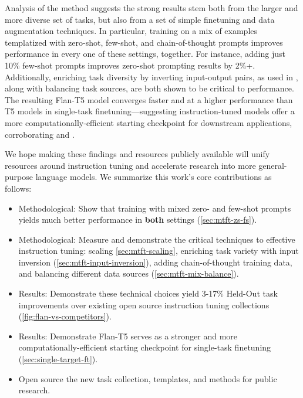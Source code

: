 Analysis of the \flantwo{} method suggests the strong results stem both from the larger and more diverse set of tasks, but also from a set of simple finetuning and data augmentation techniques.
In particular, training on a mix of examples templatized with zero-shot, few-shot, and chain-of-thought prompts improves performance in every one of these settings, together.
For instance, adding just 10\% few-shot prompts improves zero-shot prompting results by 2\%+.
Additionally, enriching task diversity by inverting input-output pairs, as used in \citep{sanh2021multitask,min-etal-2022-metaicl}, along with balancing task sources, are both shown to be critical to performance.
The resulting Flan-T5 model converges faster and at a higher performance than T5 models in single-task finetuning---suggesting instruction-tuned models offer a more computationally-efficient starting checkpoint for downstream applications, corroborating \citet{aribandi2021ext5} and \citet{tfew2022}.

We hope making these findings and resources publicly available will unify resources around instruction tuning and accelerate research into more general-purpose language models.
We summarize this work's core contributions as follows:
\begin{itemize}\itemsep0em
    \vspace{-2 mm}
    \item Methodological: Show that training with mixed zero- and few-shot prompts yields much better performance in \textbf{both} settings (\cref{sec:mtft-zs-fs}).
    \item Methodological: Measure and demonstrate the critical techniques to effective instruction tuning: scaling \cref{sec:mtft-scaling}, enriching task variety with input inversion (\cref{sec:mtft-input-inversion}), adding chain-of-thought training data, and balancing different data sources (\cref{sec:mtft-mix-balance}).
    \item Results: Demonstrate these technical choices yield 3-17\% Held-Out task improvements over existing open source instruction tuning collections (\cref{fig:flan-vs-competitors}).
    \item Results: Demonstrate Flan-T5 serves as a stronger and more computationally-efficient starting checkpoint for single-task finetuning (\cref{sec:single-target-ft}).
    \item Open source the new \flantwo{} task collection, templates, and methods for public research.
\end{itemize}

